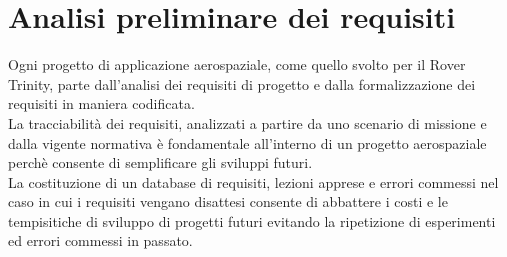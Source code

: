 \documentclass[%
corpo=11pt,
twoside,
 stile=classica,
oldstyle,
greek,%
]{toptesi}
\begin{document}
\section{Analisi preliminare dei requisiti}
Ogni progetto di applicazione aerospaziale, come quello svolto per il Rover Trinity, parte dall'analisi dei requisiti di progetto e dalla formalizzazione dei requisiti in maniera codificata. \\
La tracciabilità dei requisiti, analizzati a partire da uno scenario di missione e dalla vigente normativa è fondamentale all'interno di un progetto aerospaziale perchè consente di semplificare gli sviluppi futuri.\\
La costituzione di un database di requisiti, lezioni apprese e errori commessi nel caso in cui i requisiti vengano disattesi consente di abbattere i costi e le tempisitiche di sviluppo di progetti futuri evitando la ripetizione di esperimenti ed errori commessi in passato. 
\end{document}
